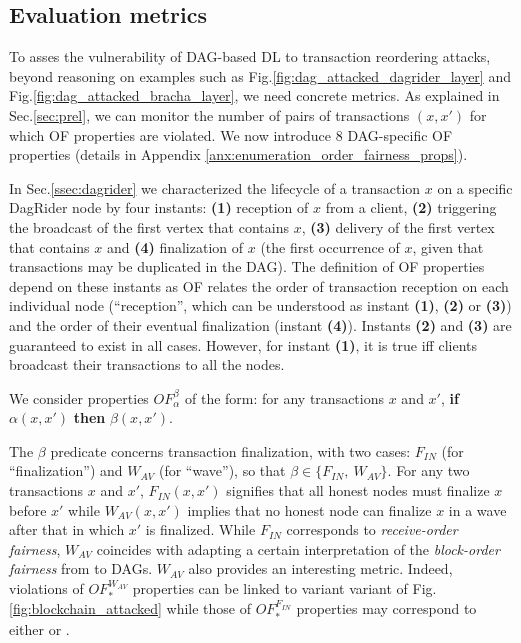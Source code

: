 

\subsection{Evaluation metrics\label{ssec:metrics}}


To asses the vulnerability of DAG-based DL to transaction reordering attacks, beyond reasoning on examples such as Fig.\ref{fig:dag_attacked_dagrider_layer} and Fig.\ref{fig:dag_attacked_bracha_layer}, we need concrete metrics.
As explained in Sec.\ref{sec:prel}, we can monitor the number of pairs of transactions $(x,x')$ for which OF properties are violated. We now introduce 8 DAG-specific OF properties (details in Appendix \ref{anx:enumeration_order_fairness_props}).

In Sec.\ref{ssec:dagrider} we characterized the lifecycle of a transaction $x$ on a specific DagRider node by four instants:
\textbf{(1)} reception of $x$ from a client,
\textbf{(2)} triggering the broadcast of the first vertex that contains $x$,
\textbf{(3)} delivery of the first vertex that contains $x$ 
and
\textbf{(4)} finalization of $x$ (the first occurrence of $x$, given that transactions may be duplicated in the DAG).
The definition of OF properties depend on these instants as OF relates the order of transaction reception on each individual node (``reception'', which can be understood as instant \textbf{(1)}, \textbf{(2)} or \textbf{(3)}) and the order of their eventual finalization (instant \textbf{(4)}).
Instants \textbf{(2)} and \textbf{(3)} are guaranteed to exist in all cases.
However, for instant \textbf{(1)}, it is true iff clients broadcast their transactions to all the nodes.


We consider properties $OF^\beta_\alpha$ of the form: for any transactions $x$ and $x'$, \textbf{if} $\alpha(x,x')$ \textbf{then} $\beta(x,x')$.

The $\beta$ predicate concerns transaction finalization, with two cases: $F_{IN}$ (for ``finalization'') and $W_{AV}$ (for ``wave''), so that $\beta \in \{F_{IN},~W_{AV}\}$.
For any two transactions $x$ and $x'$, $F_{IN}(x,x')$ signifies that all honest nodes must finalize $x$ before $x'$ while $W_{AV}(x,x')$ implies that no honest node can finalize $x$ in a wave after that in which $x'$ is finalized.
While $F_{IN}$ corresponds to {\em receive-order fairness}, $W_{AV}$ coincides with adapting a certain interpretation of the {\em block-order fairness} from \cite{order_fairness_for_byzantine_consensus} to DAGs.
$W_{AV}$ also provides an interesting metric. Indeed, violations of $OF^{W_{AV}}_*$ properties can be linked to variant variant  of Fig.\ref{fig:blockchain_attacked} while those of $OF^{F_{IN}}_*$ properties may correspond to either  or .


